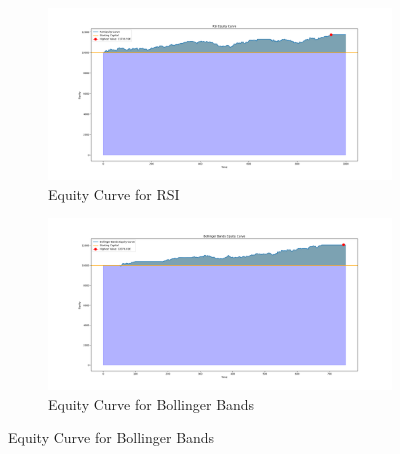\documentclass{imc-inf}
\begin{document}
	\begin{figure}[h!]
		\centering
		
		\begin{subfigure}{0.45\textwidth}
			\centering
			\includegraphics[width=\textwidth]{equity_curve_rsi.png}
			\caption{Equity Curve for RSI}
			\label{fig:equity_curve_rsi}
		\end{subfigure}
		\hfill
		\begin{subfigure}{0.45\textwidth}
			\centering
			\includegraphics[width=\textwidth]{equity_curve_bollinger_bands.png}
			\caption{Equity Curve for Bollinger Bands}
			\label{fig:equity_curve_bollinger_bands}
		\end{subfigure}
		

\end{figure}
\end{document}
